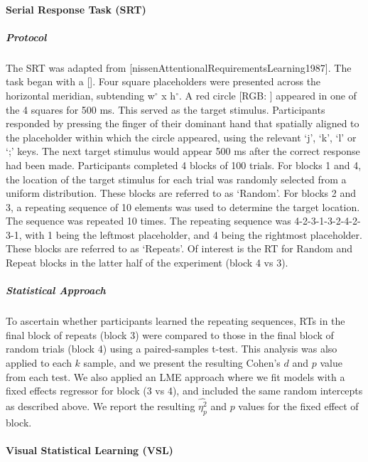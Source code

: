 \documentclass[
  12pt,
]{article}
\begin{document}
\hypertarget{serial-response-task-srt}{%
\paragraph{Serial Response Task (SRT)}\label{serial-response-task-srt}}

\hypertarget{protocol-3}{%
\subparagraph{Protocol}\label{protocol-3}}

The SRT was adapted from {[}nissenAttentionalRequirementsLearning1987{]}. The task began with a {[}{]}. Four square placeholders were presented across the horizontal meridian, subtending w\(^\circ\) x h\(^\circ\). A red circle {[}RGB: {]} appeared in one of the 4 squares for 500 ms. This served as the target stimulus. Participants responded by pressing the finger of their dominant hand that spatially aligned to the placeholder within which the circle appeared, using the relevant `j', `k', `l' or `;' keys. The next target stimulus would appear 500 ms after the correct response had been made. Participants completed 4 blocks of 100 trials. For blocks 1 and 4, the location of the target stimulus for each trial was randomly selected from a uniform distribution. These blocks are referred to as `Random'. For blocks 2 and 3, a repeating sequence of 10 elements was used to determine the target location. The sequence was repeated 10 times. The repeating sequence was 4-2-3-1-3-2-4-2-3-1, with 1 being the leftmost placeholder, and 4 being the rightmost placeholder. These blocks are referred to as `Repeats'. Of interest is the RT for Random and Repeat blocks in the latter half of the experiment (block 4 vs 3).

\hypertarget{statistical-approach-2}{%
\subparagraph{Statistical Approach}\label{statistical-approach-2}}

To ascertain whether participants learned the repeating sequences, RTs in the final block of repeats (block 3) were compared to those in the final block of random trials (block 4) using a paired-samples t-test. This analysis was also applied to each \(k\) sample, and we present the resulting Cohen's \(d\) and \(p\) value from each test. We also applied an LME approach where we fit models with a fixed effects regressor for block (3 vs 4), and included the same random intercepts as described above. We report the resulting \(\hat{\eta_{p}^{2}}\) and \(p\) values for the fixed effect of block.

\hypertarget{visual-statistical-learning-vsl}{%
\paragraph{Visual Statistical Learning (VSL)}\label{visual-statistical-learning-vsl}}
\end{document}
